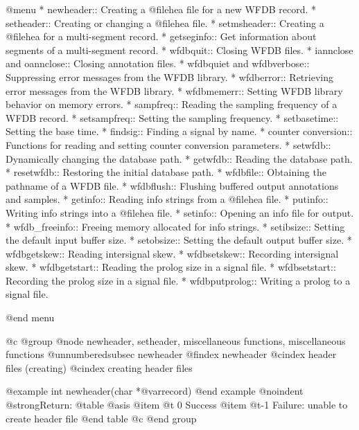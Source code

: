{{{{{{{{@menu
* newheader::			Creating a @file{hea} file for a new WFDB
				record.
* setheader::			Creating or changing a @file{hea} file.
* setmsheader::                 Creating a @file{hea} for a multi-segment
                                record.
* getseginfo::                  Get information about segments of a
                                multi-segment record.
* wfdbquit::			Closing WFDB files.
* iannclose and oannclose::     Closing annotation files.
* wfdbquiet and wfdbverbose::	Suppressing error messages from the WFDB library.
* wfdberror::			Retrieving error messages from the WFDB library.
* wfdbmemerr::                  Setting WFDB library behavior on memory errors.
* sampfreq::			Reading the sampling frequency of a WFDB record.
* setsampfreq::			Setting the sampling frequency.
* setbasetime::			Setting the base time.
* findsig::                     Finding a signal by name.
* counter conversion::		Functions for reading and setting counter
				conversion parameters.
* setwfdb::			Dynamically changing the database path.
* getwfdb::			Reading the database path.
* resetwfdb::                   Restoring the initial database path.
* wfdbfile::			Obtaining the pathname of a WFDB file.
* wfdbflush::			Flushing buffered output annotations and
				samples.
* getinfo::			Reading info strings from a @file{hea} file.
* putinfo::			Writing info strings into a @file{hea} file.
* setinfo::			Opening an info file for output.
* wfdb_freeinfo::               Freeing memory allocated for info strings.
* setibsize::			Setting the default input buffer size.
* setobsize::			Setting the default output buffer size.
* wfdbgetskew::                 Reading intersignal skew.
* wfdbsetskew::                 Recording intersignal skew.
* wfdbgetstart::                Reading the prolog size in a signal file.
* wfdbsetstart::                Recording the prolog size in a signal file.
* wfdbputprolog::               Writing a prolog to a signal file.

@end menu

@c @group
@node     newheader, setheader, miscellaneous functions, miscellaneous functions
@unnumberedsubsec newheader
@findex newheader
@cindex header files (creating)
@cindex creating header files

@example
int newheader(char *@var{record})
@end example
@noindent
@strong{Return:}
@table @asis
@item @t{ 0}
Success
@item @t{-1}
Failure: unable to create header file
@end table
@c @end group

}}}}}}}}
